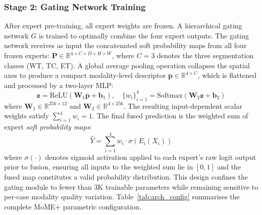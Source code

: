 \documentclass[conference]{IEEEtran}
\begin{document}
\subsubsection{Stage 2: Gating Network Training}
After expert pre-training, all expert weights are frozen. A hierarchical gating network $G$ is trained to optimally combine the four expert outputs. The gating network receives as input the concatenated soft probability maps from all four frozen experts: $\mathbf{P} \in \mathbb{R}^{4 \times C \times D \times H \times W}$, where $C=3$ denotes the three segmentation classes (WT, TC, ET). A global average pooling operation collapses the spatial axes to produce a compact modality-level descriptor $\bar{\mathbf{p}} \in \mathbb{R}^{4 \times C}$, which is flattened and processed by a two-layer MLP:
\begin{equation}
\mathbf{z} = \text{ReLU}(\mathbf{W}_1 \bar{\mathbf{p}} + \mathbf{b}_1), \quad \{w_i\}_{i=1}^{4} = \text{Softmax}(\mathbf{W}_2 \mathbf{z} + \mathbf{b}_2)
\end{equation}
where $\mathbf{W}_1 \in \mathbb{R}^{256 \times 12}$ and $\mathbf{W}_2 \in \mathbb{R}^{4 \times 256}$. The resulting input-dependent scalar weights satisfy $\sum_{i=1}^{4} w_i = 1$. The final fused prediction is the weighted sum of expert \emph{soft probability maps}:
\begin{equation}
\hat{Y} = \sum_{i=1}^{4} w_i \cdot \sigma\!\left(E_i(X_i)\right)
\end{equation}
where $\sigma(\cdot)$ denotes sigmoid activation applied to each expert's raw logit output prior to fusion, ensuring all inputs to the weighted sum lie in $[0,1]$ and the fused map constitutes a valid probability distribution. This design confines the gating module to fewer than 3K trainable parameters while remaining sensitive to per-case modality quality variation. Table~\ref{tab:arch_config} summarises the complete MoME+ parametric configuration.
\end{document}
